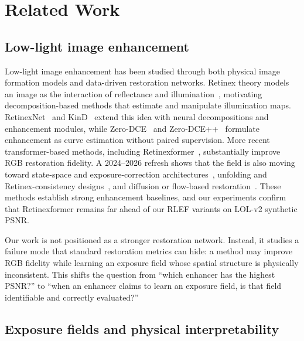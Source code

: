 \section{Related Work}
\label{sec:related_work}

\subsection{Low-light image enhancement}

Low-light image enhancement has been studied through both physical image formation models and data-driven restoration networks. Retinex theory models an image as the interaction of reflectance and illumination~\cite{land1971retinex}, motivating decomposition-based methods that estimate and manipulate illumination maps. RetinexNet~\cite{wei2018deepretinex} and KinD~\cite{zhang2019kind} extend this idea with neural decompositions and enhancement modules, while Zero-DCE~\cite{guo2020zerodce} and Zero-DCE++~\cite{li2021zerodcepp} formulate enhancement as curve estimation without paired supervision. More recent transformer-based methods, including Retinexformer~\cite{cai2023retinexformer}, substantially improve RGB restoration fidelity. A 2024--2026 refresh shows that the field is also moving toward state-space and exposure-correction architectures~\cite{weng2024mamballie,dong2024ecmamba,li2024osmamba}, unfolding and Retinex-consistency designs~\cite{he2025unfoldir,xu2025consistretinex}, and diffusion or flow-based restoration~\cite{xu2025boostingfidelityfo,wei2025illumflow}. These methods establish strong enhancement baselines, and our experiments confirm that Retinexformer remains far ahead of our RLEF variants on LOL-v2 synthetic PSNR.

Our work is not positioned as a stronger restoration network. Instead, it studies a failure mode that standard restoration metrics can hide: a method may improve RGB fidelity while learning an exposure field whose spatial structure is physically inconsistent. This shifts the question from ``which enhancer has the highest PSNR?'' to ``when an enhancer claims to learn an exposure field, is that field identifiable and correctly evaluated?''

\subsection{Exposure fields and physical interpretability}

